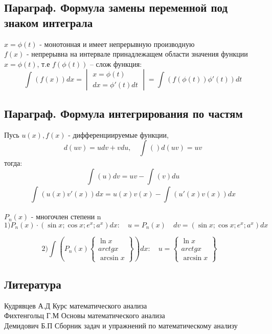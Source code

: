 \documentclass[a4paper, 12pt]{article}
\begin{document}
\subsection{Параграф. Формула замены переменной под знаком интеграла}
$ x = \phi (t) $ - монотонная и имеет непрерывную производную\\
$ f(x) $ - непрерывна на интервале принадлежащем области значения функции $ x = \phi (t) $, т.е $ f(\phi (t)) $ -- слож функция:
\[
      \int_{}^{}\left(f(x)\right)dx = \begin{vmatrix}
    x = \phi (t)\\
    dx = \phi' (t) dt
  \end{vmatrix} = \int_{}^{}\left(f(\phi (t))\phi'(t)\right)dt 
\]    


\subsection{Параграф. Формула интегрирования по частям}

Пусь $ u(x),f(x) $ -  дифференциируемые  функции, \[
  d(uv) = u dv + v du, \quad \int_{}^{}\left(\right)d(uv) = uv 
\]
тогда: \[
  \int_{}^{}\left(u\right)dv = u v - \int_{}^{}\left(v\right)du 
\]
\[
  \int_{}^{}\left(u(x)v'(x)\right)dx = u(x)v(x) - \int_{}^{}\left(u'(x)v(x)\right)dx 
\]

$ P_n(x) $ - многочлен степени n\\
\[
   1)P_n(x)\cdot (\sin x;\cos x;e^x;a^x)dx: \quad u = P_n(x) \quad dv = (\sin x;\cos x;e^x;a^x)dx
 \] 

\[
  2)\int_{}^{}\left(P_n(x)\begin{Bmatrix}
    \ln x \\
    arctg x\\
    \arcsin x
  \end{Bmatrix}\right)dx: \quad u = \begin{Bmatrix}
    \ln x \\
    arctg x\\
    \arcsin x
  \end{Bmatrix} \quad  
\]

    




\newpage
\subsection*{Литература}
Кудрявцев А.Д Курс математического анализа\\
Фихтенгольц Г.М Основы математического анализа\\
Демидович Б.П Сборник задач и упражнений по математическому анализу\\
\end{document}
